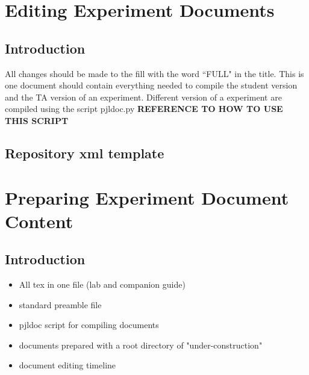 \documentclass[justified]{pjlProcessDocs}
\begin{document}





\section{Editing Experiment Documents}\label{sec:EquipEdit}

\subsection{Introduction}

All changes should be made to the fill with the word ``FULL" in the title. This is one document should contain everything needed to compile the student version and the TA version of an experiment. Different version of a experiment are compiled using the script pjldoc.py {\bf REFERENCE TO HOW TO USE THIS SCRIPT}



\subsection{Repository xml template}



\section{Preparing Experiment Document Content}

\subsection{Introduction}
\begin{itemize}
\item All tex in one file (lab and companion guide)
\item standard preamble file
\item pjldoc script for compiling documents
\item documents prepared with a root directory of "under-construction"
\item document editing timeline
\end{itemize}
\end{document}
